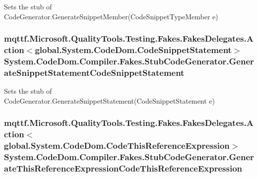 Sets the stub of Code\-Generator.\-Generate\-Snippet\-Member(\-Code\-Snippet\-Type\-Member e)

\hypertarget{class_system_1_1_code_dom_1_1_compiler_1_1_fakes_1_1_stub_code_generator_ad0f2090ce40126720f417a7842c21d62}{
\subsubsection[{Generate\-Snippet\-Statement\-Code\-Snippet\-Statement}]{\setlength{\rightskip}{0pt plus 5cm}mqttf.\-Microsoft.\-Quality\-Tools.\-Testing.\-Fakes.\-Fakes\-Delegates.\-Action$<$global.\-System.\-Code\-Dom.\-Code\-Snippet\-Statement$>$ System.\-Code\-Dom.\-Compiler.\-Fakes.\-Stub\-Code\-Generator.\-Generate\-Snippet\-Statement\-Code\-Snippet\-Statement}}\label{class_system_1_1_code_dom_1_1_compiler_1_1_fakes_1_1_stub_code_generator_ad0f2090ce40126720f417a7842c21d62}


Sets the stub of Code\-Generator.\-Generate\-Snippet\-Statement(\-Code\-Snippet\-Statement e)

\hypertarget{class_system_1_1_code_dom_1_1_compiler_1_1_fakes_1_1_stub_code_generator_ae6aa4b35bfbd56fb776b732a190e1515}{
\subsubsection[{Generate\-This\-Reference\-Expression\-Code\-This\-Reference\-Expression}]{\setlength{\rightskip}{0pt plus 5cm}mqttf.\-Microsoft.\-Quality\-Tools.\-Testing.\-Fakes.\-Fakes\-Delegates.\-Action$<$global.\-System.\-Code\-Dom.\-Code\-This\-Reference\-Expression$>$ System.\-Code\-Dom.\-Compiler.\-Fakes.\-Stub\-Code\-Generator.\-Generate\-This\-Reference\-Expression\-Code\-This\-Reference\-Expression}}\label{class_system_1_1_code_dom_1_1_compiler_1_1_fakes_1_1_stub_code_generator_ae6aa4b35bfbd56fb776b732a190e1515}


